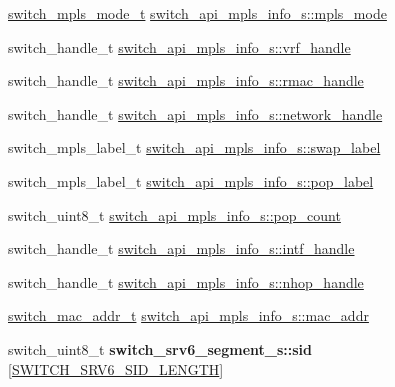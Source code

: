 \begin{DoxyCompactItemize}
\item 
\hyperlink{group__Tunnel_ga31b707543626fd0d899f011a2bf91fc9}{switch\+\_\+mpls\+\_\+mode\+\_\+t} \hyperlink{group__Tunnel_ga74f8a7c6cdb442d448911935d40a43a0}{switch\+\_\+api\+\_\+mpls\+\_\+info\+\_\+s\+::mpls\+\_\+mode}
\item 
switch\+\_\+handle\+\_\+t \hyperlink{group__Tunnel_ga93781a9c1fb024b92c97056e2c95cc9d}{switch\+\_\+api\+\_\+mpls\+\_\+info\+\_\+s\+::vrf\+\_\+handle}
\item 
switch\+\_\+handle\+\_\+t \hyperlink{group__Tunnel_gae87675e11f4c9787d9937f500bfbc914}{switch\+\_\+api\+\_\+mpls\+\_\+info\+\_\+s\+::rmac\+\_\+handle}
\item 
switch\+\_\+handle\+\_\+t \hyperlink{group__Tunnel_gac651442108f51cc85587aafe8d7838a9}{switch\+\_\+api\+\_\+mpls\+\_\+info\+\_\+s\+::network\+\_\+handle}
\item 
switch\+\_\+mpls\+\_\+label\+\_\+t \hyperlink{group__Tunnel_ga8d085b3d34b94d8f7d454f218d4383ae}{switch\+\_\+api\+\_\+mpls\+\_\+info\+\_\+s\+::swap\+\_\+label}
\item 
switch\+\_\+mpls\+\_\+label\+\_\+t \hyperlink{group__Tunnel_ga6c0a6fe3e1634d7041b2812d232f9fe2}{switch\+\_\+api\+\_\+mpls\+\_\+info\+\_\+s\+::pop\+\_\+label}
\item 
switch\+\_\+uint8\+\_\+t \hyperlink{group__Tunnel_gaf0d8b8fada5e6ac49400245cafe38524}{switch\+\_\+api\+\_\+mpls\+\_\+info\+\_\+s\+::pop\+\_\+count}
\item 
switch\+\_\+handle\+\_\+t \hyperlink{group__Tunnel_ga8d7c143424c5cb897e18e749ef9aaff7}{switch\+\_\+api\+\_\+mpls\+\_\+info\+\_\+s\+::intf\+\_\+handle}
\item 
switch\+\_\+handle\+\_\+t \hyperlink{group__Tunnel_ga78469526e456f991248a2cd545be8008}{switch\+\_\+api\+\_\+mpls\+\_\+info\+\_\+s\+::nhop\+\_\+handle}
\item 
\hyperlink{structswitch__mac__addr__s}{switch\+\_\+mac\+\_\+addr\+\_\+t} \hyperlink{group__Tunnel_ga62f1b9c744e029bab8e5688751f3f347}{switch\+\_\+api\+\_\+mpls\+\_\+info\+\_\+s\+::mac\+\_\+addr}
\item 
\hypertarget{group__Tunnel_ga13c6acc4575e1f194c05592e88b0d9bf}{switch\+\_\+uint8\+\_\+t {\bfseries switch\+\_\+srv6\+\_\+segment\+\_\+s\+::sid} \mbox{[}\hyperlink{group__Tunnel_ga9d8eb6604f4c584e8bcd459e24868968}{S\+W\+I\+T\+C\+H\+\_\+\+S\+R\+V6\+\_\+\+S\+I\+D\+\_\+\+L\+E\+N\+G\+T\+H}\mbox{]}}\label{group__Tunnel_ga13c6acc4575e1f194c05592e88b0d9bf}


\end{DoxyCompactItemize}
